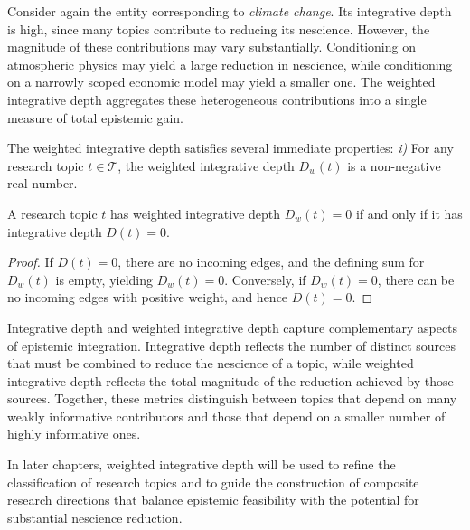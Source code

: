 \begin{example}
Consider again the entity corresponding to \emph{climate change}. Its integrative depth is high, since many topics contribute to reducing its nescience. However, the magnitude of these contributions may vary substantially. Conditioning on atmospheric physics may yield a large reduction in nescience, while conditioning on a narrowly scoped economic model may yield a smaller one. The weighted integrative depth aggregates these heterogeneous contributions into a single measure of total epistemic gain.
\end{example}

The weighted integrative depth satisfies several immediate properties: \emph{i)} For any research topic $t \in \mathcal{T}$, the weighted integrative depth $D_w(t)$ is a non-negative real number. 



\begin{proposition}
A research topic $t$ has weighted integrative depth $D_w(t)=0$ if and only if it has integrative depth $D(t)=0$.
\end{proposition}
\begin{proof}
If $D(t)=0$, there are no incoming edges, and the defining sum for $D_w(t)$ is empty, yielding $D_w(t)=0$. Conversely, if $D_w(t)=0$, there can be no incoming edges with positive weight, and hence $D(t)=0$.
\end{proof}

Integrative depth and weighted integrative depth capture complementary aspects of epistemic integration. Integrative depth reflects the number of distinct sources that must be combined to reduce the nescience of a topic, while weighted integrative depth reflects the total magnitude of the reduction achieved by those sources. Together, these metrics distinguish between topics that depend on many weakly informative contributors and those that depend on a smaller number of highly informative ones.

In later chapters, weighted integrative depth will be used to refine the classification of research topics and to guide the construction of composite research directions that balance epistemic feasibility with the potential for substantial nescience reduction.


